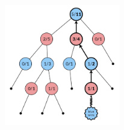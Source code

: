 \begin{search_page}
\includegraphics[width=300px,height=200px]{images/mcts_backpropagation.png}



\end{search_page}

